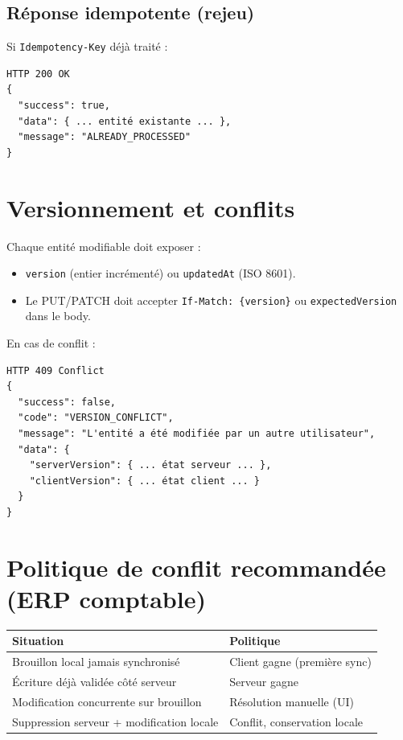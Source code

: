 \documentclass[12pt,a4paper]{report}
\begin{document}
\subsection{Réponse idempotente (rejeu)}

Si \texttt{Idempotency-Key} déjà traité :

\begin{verbatim}
HTTP 200 OK
{
  "success": true,
  "data": { ... entité existante ... },
  "message": "ALREADY_PROCESSED"
}
\end{verbatim}

\section{Versionnement et conflits}

Chaque entité modifiable doit exposer :
\begin{itemize}
  \item \texttt{version} (entier incrémenté) ou \texttt{updatedAt} (ISO 8601).
  \item Le PUT/PATCH doit accepter \texttt{If-Match: \{version\}} ou \texttt{expectedVersion} dans le body.
\end{itemize}

En cas de conflit :

\begin{verbatim}
HTTP 409 Conflict
{
  "success": false,
  "code": "VERSION_CONFLICT",
  "message": "L'entité a été modifiée par un autre utilisateur",
  "data": {
    "serverVersion": { ... état serveur ... },
    "clientVersion": { ... état client ... }
  }
}
\end{verbatim}

\section{Politique de conflit recommandée (ERP comptable)}

\begin{longtable}{@{}p{4cm}p{8cm}@{}}
\hline
\textbf{Situation} & \textbf{Politique} \\
\hline

Brouillon local jamais synchronisé & Client gagne (première sync) \\
Écriture déjà validée côté serveur & Serveur gagne \\
Modification concurrente sur brouillon & Résolution manuelle (UI) \\
Suppression serveur + modification locale & Conflit, conservation locale \\
\hline
\end{longtable}
\end{document}

